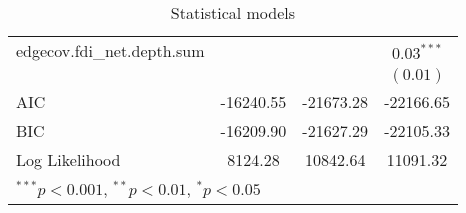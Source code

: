 \documentclass{article}
\begin{document}
\begin{table}[!htb]
\begin{center}
\begin{tabular}{l c c c }
edgecov.fdi\_net.depth.sum      &               &               & $0.03^{***}$  \\
                                &               &               & $(0.01)$      \\
\hline
AIC                             & -16240.55     & -21673.28     & -22166.65     \\
BIC                             & -16209.90     & -21627.29     & -22105.33     \\
Log Likelihood                  & 8124.28       & 10842.64      & 11091.32      \\
\hline
\multicolumn{4}{l}{\scriptsize{$^{***}p<0.001$, $^{**}p<0.01$, $^*p<0.05$}}
\end{tabular}
\caption{Statistical models}
\label{table:coefficients}
\end{center}
\end{table}
\doublespacing

\newpage

\end{document}
